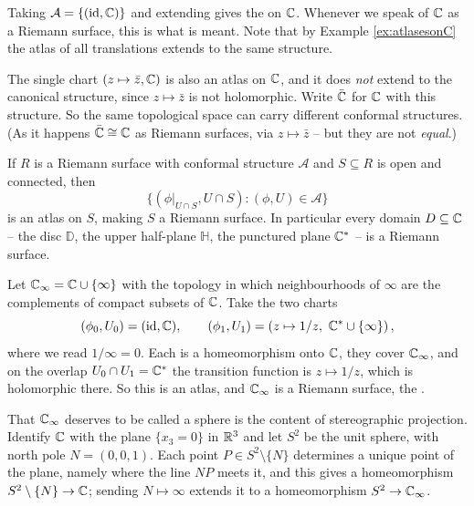 \documentclass[a4paper]{scrartcl}
\newcommand{\id}{\operatorname{id}}
\newcommand{\Cinf}{\C_\infty}
\newcommand{\disc}{\mathbb{D}}
\newcommand{\Hp}{\mathbb{H}}
\newcommand{\Cs}{\C^*}
\begin{document}
\begin{example}
	Taking $\mathcal{A} = \{(\id, \C)\}$ and extending gives the  on $\mathbb{C}$. Whenever we speak of $\mathbb{C}$ as a Riemann surface, this is
	what is meant. Note that by Example \ref{ex:atlasesonC} the atlas of all translations
	extends to the same structure.
\end{example}

\begin{example}
	The single chart $(z \mapsto \bar z, \mathbb{C})$ is also an atlas on $\mathbb{C}$, and it does
	\emph{not} extend to the canonical structure, since $z \mapsto \bar z$ is not
	holomorphic. Write $\bar{\mathbb{C}}$ for $\mathbb{C}$ with this structure. So the same topological
	space can carry different conformal structures. (As it happens $\bar {\mathbb{C}} \cong \mathbb{C}$ as
	Riemann surfaces, via $z \mapsto \bar z$ -- but they are not \emph{equal}.)
\end{example}

\begin{example}\label{ex:opensubset}
	If $R$ is a Riemann surface with conformal structure $\mathcal{A}$ and
	$S \subseteq R$ is open and connected, then
	$$
	\{ (\phi|_{U \cap S}, U \cap S) : (\phi, U) \in \mathcal{A} \}
	$$
	is an atlas on $S$, making $S$ a Riemann surface. In particular every domain
	$D \subseteq \mathbb{C}$ -- the disc $\disc$, the upper half-plane $\Hp$, the punctured plane
	$\Cs$ -- is a Riemann surface.
\end{example}

\begin{example}\label{ex:sphere}
	Let $\Cinf = \C \cup \{\infty\}$ with the topology in which neighbourhoods of $\infty$
	are the complements of compact subsets of $\mathbb{C}$. Take the two charts
	$$
	(\phi_0, U_0) = (\id, \C), \qquad (\phi_1, U_1) = \left(z \mapsto 1/z, \ \Cs \cup \{\infty\}\right),
	$$
	where we read $1/\infty = 0$. Each is a homeomorphism onto $\mathbb{C}$, they cover $\Cinf$,
	and on the overlap $U_0 \cap U_1 = \Cs$ the transition function is $z \mapsto 1/z$,
	which is holomorphic there. So this is an atlas, and $\Cinf$ is a Riemann surface,
	the .
\end{example}

That $\Cinf$ deserves to be called a sphere is the content of stereographic projection.
Identify $\mathbb{C}$ with the plane $\{x_3 = 0\}$ in $\mathbb{R}^3$ and let $S^2$ be the unit sphere,
with north pole $N = (0,0,1)$. Each point $P \in S^2 \setminus \{N\}$ determines a unique
point of the plane, namely where the line $NP$ meets it, and this gives a homeomorphism
$S^2 \setminus \{N\} \to \mathbb{C}$; sending $N \mapsto \infty$ extends it to a homeomorphism
$S^2 \to \Cinf$.
\end{document}
